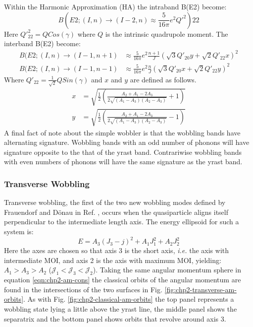 Within the Harmonic Approximation (HA) the intraband B(E2) \cite{wobblingGeometry} become:
\begin{equation}
\label{eqn:chp2-simple-wobb-intraband-e2-red-mat}
B(E2;(I,n)\rightarrow(I-2,n)\approx\frac{5}{16\pi}e^2Q'^2){22}
\end{equation}
Here $Q'^2_{22}=QCos(\gamma)$ where $Q$ is the intrinsic quadrupole moment. The interband B(E2) \cite{wobblingGeometry} become:
\begin{align}
\label{eqn:chp2-simple-wobb-interband-e2-red-mat}
B(E2;(I,n)\rightarrow(I-1,n+1)&\approx\frac{5}{16\pi}e^2\frac{n+1}{J}\left(\sqrt{3}Q'_{20}y+\sqrt{2}Q'_{22}x\right)^2\\
B(E2;(I,n)\rightarrow(I-1,n-1)&\approx\frac{5}{16\pi}e^2\frac{n}{J}\left(\sqrt{3}Q'_{20}x+\sqrt{2}Q'_{22}y\right)^2
\end{align}
Where $Q'_{22}=\frac{1}{\sqrt{2}}QSin(\gamma)$ and $x$ and $y$ are defined as follows.
\begin{align}
\label{eqn:chp2-simple-wobb-x-y-params}
x&=\sqrt{\frac{1}{2}\left(\frac{A_2+A_1-2A_3}{2\sqrt{(A_1-A_3)(A_2-A_3)}}+1\right)}\\
y&=\sqrt{\frac{1}{2}\left(\frac{A_2+A_1-2A_3}{2\sqrt{(A_1-A_3)(A_2-A_3)}}-1\right)}\nonumber
\end{align}
A final fact of note about the simple wobbler is that the wobbling bands have alternating signature. Wobbling bands with an odd number of phonons will have signature opposite to the that of the yrast band. Contrariwise wobbling bands with even numbers of phonons will have the same signature as the yrast band.

\subsubsection{Transverse Wobbling}
\label{sssec:models-wobbling-transverse-wobbling}
Transverse wobbling, the first of the two new wobbling modes defined by Frauendorf and D\"onau in Ref. \cite{frauendorfTAC}, occurs when the quasiparticle aligns itself perpendicular to the intermediate length axis. The energy ellipsoid for such a system is:
\begin{equation}
\label{eqn:chp2-transverse-en-ellipsoid}
E=A_3(J_3-j)^2 + A_1J_1^2 + A_2J_2^2
\end{equation}
Here the axes are chosen so that axis 3 is the short axis, \emph{i.e.} the axis with intermediate MOI, and axis 2 is the axis with maximum MOI, yielding: $A_1>A_3>A_2$ ($\mathcal{J}_1<\mathcal{J}_3<\mathcal{J}_2$). Taking the same angular momentum sphere in equation \ref{eqn:chp2-am-cons} the classical orbits of the angular momentum are found in the intersections of the two surfaces in Fig. \ref{fig:chp2-transverse-am-orbits}. As with Fig. \ref{fig:chp2-classical-am-orbits} the top panel represents a wobbling state lying a little above the yrast line, the middle panel shows the separatrix and the bottom panel shows orbits that revolve around axis 3.

